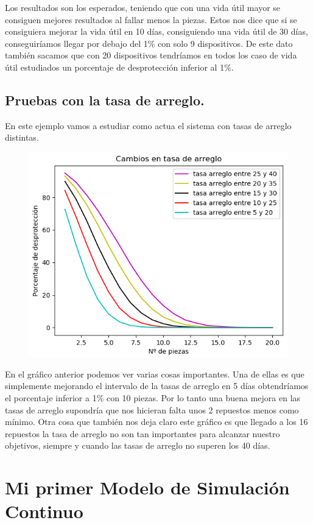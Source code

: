 \documentclass[]{article}
\begin{document}
Los resultados son los esperados, teniendo que con una vida útil mayor se consiguen mejores resultados al fallar menos la piezas. Estos nos dice que si se consiguiera mejorar la vida útil en 10 días, consiguiendo una vida útil de 30 días, conseguiríamos llegar por debajo del 1\% con solo 9 dispositivos. De este dato también sacamos que con 20 dispositivos tendríamos en todos los caso de vida útil estudiados un porcentaje de desprotección inferior al 1\%.
\newpage
\subsection{Pruebas con la tasa de arreglo.}
En este ejemplo vamos a estudiar como actua el sistema con tasas de arreglo distintas. 
\begin{figure}[H]
	\centering
	\includegraphics[width=1\linewidth]{img/screenshot0019}
	\caption{}
	\label{fig:screenshot0019}
\end{figure}

En el gráfico anterior podemos ver varias cosas importantes. Una de ellas es que simplemente mejorando el intervalo de la tasas de arreglo en 5 días obtendríamos el porcentaje inferior a 1\% con 10 piezas. Por lo tanto una buena mejora en las tasas de arreglo supondría que nos hicieran falta unos 2 repuestos menos como mínimo. Otra cosa que también nos deja claro este gráfico es que llegado a los 16 repuestos la tasa de arreglo no son tan importantes para alcanzar nuestro objetivos, siempre y cuando las tasas de arreglo no superen los 40 días.
\newpage
\section{Mi primer Modelo de Simulación Continuo}
\end{document}
